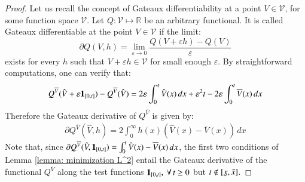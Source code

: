 \begin{proof}
Let us recall the concept of Gateaux differentiability at a point $V \in \mathcal{V}$, for some function space $\mathcal{V}$. Let $Q: \mathcal{V} \mapsto \mathbb{R}$ be an arbitrary functional. It is called Gateaux differentiable at the point $V \in \mathcal{V}$ if the limit:
$$
 \partial Q (V, h) =\lim _{\varepsilon \rightarrow 0} \frac{Q(V+\varepsilon h)-Q(V)}{\varepsilon}
$$
exists for every $h$ such that $V+\varepsilon h \in \mathcal{V}$ for small enough $\varepsilon$. By straightforward computations, one can verify that:
    \begin{align*}
        Q^{\overline{V}}(\hat{V} + \varepsilon \mathbf{1}_{[0,t]}) - Q^{\overline{V}}(\hat{V}) = 2 \varepsilon \int_{0}^{t} \hat{V}(x) \, dx + \varepsilon^2 t - 2 \varepsilon \int_{0}^{t} \overline{V}(x) \, dx
    \end{align*}
    Therefore the Gateaux derivative of $Q^{\overline{V}}$ is given by:
    \begin{align}\label{eq: gateaux derivative}
        \partial Q^{\overline{V}} (\hat{V}, h) = 2 \int_{0}^{\infty} h(x) \left(\hat{V}(x) - \overline{V}(x) \right) \, dx
    \end{align}
    Note that, since $\partial Q^{\overline{V}} (\hat{V}, \mathbf{1}_{[0,t]}) = \int_{0}^{t} \hat{V}(x) - \overline{V}(x) \, dx$, the first two conditions of Lemma \ref{lemma: minimization L^2} entail the Gateaux derivative of the functional $Q^{\overline{V}}$ along the test functions $\mathbf{1}_{[0,t]}, \: \forall \, t \geq 0$ but $t \notin [\ubar{x},\bar{x}]$.  
    

\end{proof}
